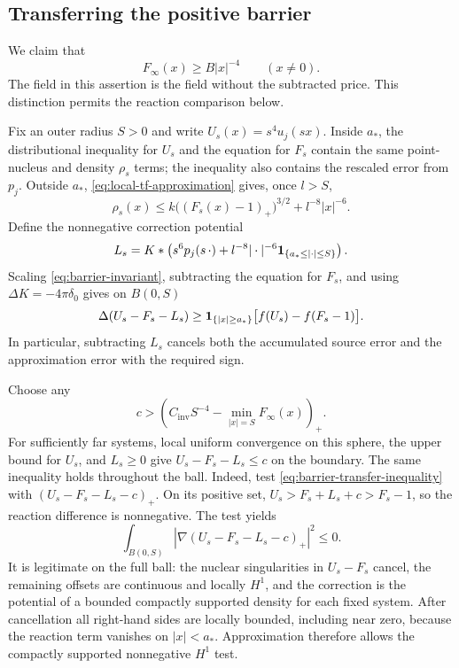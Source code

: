\subsection{Transferring the positive barrier}

We claim that
\begin{equation}\label{eq:limit-positive-barrier}
 F_\infty(x)\ge B|x|^{-4}\qquad(x\ne0).
\end{equation}
The field in this assertion is the field without the subtracted
price.  This distinction permits the reaction comparison below.

Fix an outer radius $S>0$ and write $U_s(x)=s^4u_j(sx)$.
Inside $a_*$, the distributional inequality for $U_s$ and the
equation for $F_s$ contain the same point-nucleus and density
$\rho_s$ terms; the inequality also contains the rescaled error
from $p_j$.
Outside
$a_*$, \cref{eq:local-tf-approximation} gives, once $l>S$,
\[
 \rho_s(x)\le k\bigl((F_s(x)-1)_+\bigr)^{3/2}
                         +l^{-8}|x|^{-6}.
\]
Define the nonnegative correction potential
\begin{equation}\label{eq:barrier-correction}
 L_s=K*\left(s^6p_j(s\,\cdot)
       +l^{-8}|\cdot|^{-6}\mathbf 1_{\{a_*\le|\cdot|\le S\}}\right).
\end{equation}
Scaling \cref{eq:barrier-invariant}, subtracting the equation for
$F_s$, and using $\Delta K=-4\pi\delta_0$ gives on $B(0,S)$
\begin{equation}\label{eq:barrier-transfer-inequality}
 \Delta(U_s-F_s-L_s)
 \ge\mathbf 1_{\{|x|\ge a_*\}}\bigl[f(U_s)-f(F_s-1)\bigr].
\end{equation}
In particular, subtracting $L_s$ cancels both the accumulated
source error and the approximation error with the required sign.

Choose any
\[
 c>\left(C_{\mathrm{inv}}S^{-4}
                   -\min_{|x|=S}F_\infty(x)\right)_+.
\]
For sufficiently far systems, local uniform convergence on this
sphere, the upper bound for $U_s$, and $L_s\ge0$ give
$U_s-F_s-L_s\le c$ on the boundary.  The same inequality holds
throughout the ball.  Indeed, test
\cref{eq:barrier-transfer-inequality} with
$(U_s-F_s-L_s-c)_+$.  On its positive set,
$U_s>F_s+L_s+c>F_s-1$, so the reaction difference is nonnegative.
The test yields
\[
 \int_{B(0,S)}\left|\nabla(U_s-F_s-L_s-c)_+\right|^2\le0.
\]
It is legitimate on the full ball: the nuclear singularities in
$U_s-F_s$ cancel, the remaining offsets are continuous and locally
$H^1$, and the correction is the potential of a bounded compactly
supported density for each fixed system.  After cancellation all
right-hand sides are locally bounded, including near zero, because
the reaction term vanishes on $|x|<a_*$.  Approximation therefore
allows the compactly supported nonnegative $H^1$ test.

